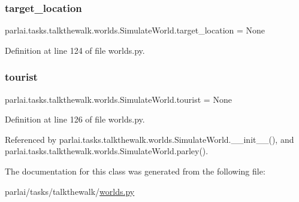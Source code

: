 \subsubsection{\texorpdfstring{target\+\_\+location}{target\_location}}
{\footnotesize\ttfamily parlai.\+tasks.\+talkthewalk.\+worlds.\+Simulate\+World.\+target\+\_\+location = None\hspace{0.3cm}{\ttfamily [static]}}



Definition at line 124 of file worlds.\+py.

\mbox{\label{classparlai_1_1tasks_1_1talkthewalk_1_1worlds_1_1SimulateWorld_abfa37e958248323fcffa9455487dca0c}} 
\subsubsection{\texorpdfstring{tourist}{tourist}}
{\footnotesize\ttfamily parlai.\+tasks.\+talkthewalk.\+worlds.\+Simulate\+World.\+tourist = None\hspace{0.3cm}{\ttfamily [static]}}



Definition at line 126 of file worlds.\+py.



Referenced by parlai.\+tasks.\+talkthewalk.\+worlds.\+Simulate\+World.\+\_\+\+\_\+init\+\_\+\+\_\+(), and parlai.\+tasks.\+talkthewalk.\+worlds.\+Simulate\+World.\+parley().



The documentation for this class was generated from the following file\+:\begin{DoxyCompactItemize}
\item 
parlai/tasks/talkthewalk/\hyperlink{parlai_2tasks_2talkthewalk_2worlds_8py}{worlds.\+py}\end{DoxyCompactItemize}
